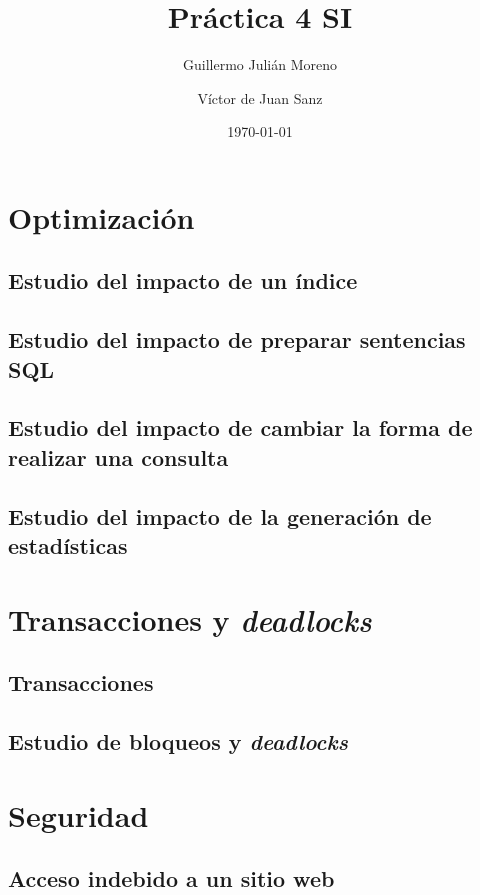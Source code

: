 \documentclass{article}
\title{Práctica 4 SI}
\date{\today}
\author{Guillermo Julián Moreno \and Víctor de Juan Sanz}
\begin{document}
\maketitle

\section{Optimización}

\subsection{Estudio del impacto de un índice}

\subsection{Estudio del impacto de preparar sentencias SQL}

\subsection{Estudio del impacto de cambiar la forma de realizar una consulta}

\subsection{Estudio del impacto de la generación de estadísticas}

\section{Transacciones y \textit{deadlocks}}

\subsection{Transacciones}

\subsection{Estudio de bloqueos y \textit{deadlocks}}

\section{Seguridad}

\subsection{Acceso indebido a un sitio web}
\end{document}

